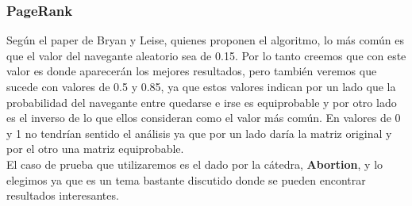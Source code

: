 \subsubsection{PageRank}
Según el paper de Bryan y Leise, quienes proponen el algoritmo, lo más común es que el valor del navegante aleatorio sea de 0.15. Por lo tanto creemos que con este valor es donde aparecerán los mejores resultados, pero también veremos que sucede con valores de 0.5 y 0.85, ya que estos valores indican por un lado que la probabilidad del navegante entre quedarse e irse es equiprobable y por otro lado es el inverso de lo que ellos consideran como el valor más común. En valores de 0 y 1 no tendrían sentido el análisis ya que por un lado daría la matriz original y por el otro una matriz equiprobable.\\
El caso de prueba que utilizaremos es el dado por la cátedra, \textbf{Abortion}, y lo elegimos ya que es un tema bastante discutido donde se pueden encontrar resultados interesantes.


